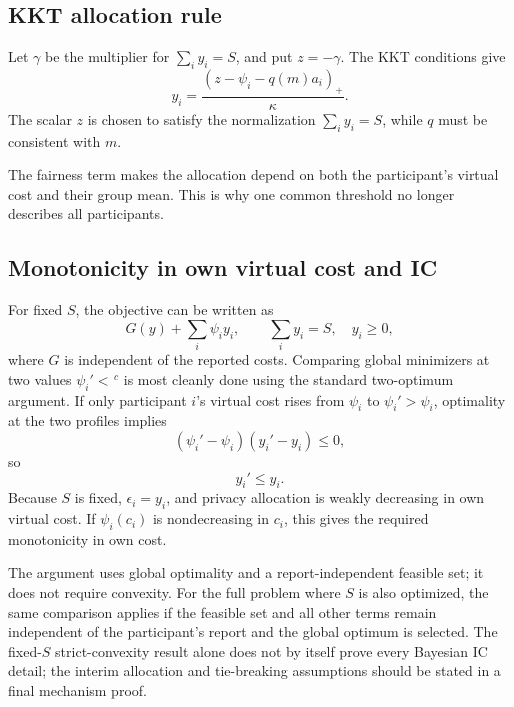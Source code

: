 \documentclass[11pt,a4paper]{article}
\newcommand{\1}{\mathbf{1}}
\begin{document}
\subsection{KKT allocation rule}

Let \(\gamma\) be the multiplier for \(\sum_i y_i=S\), and put
\(z=-\gamma\). The KKT conditions give
\begin{equation}
  \boxed{
  y_i
  =
  \frac{(z-\psi_i-q(m)a_i)_+}{\kappa}.
  }
  \label{eq:kkt-y}
\end{equation}
The scalar \(z\) is chosen to satisfy the normalization
\(\sum_i y_i=S\), while \(q\) must be consistent with \(m\).

The fairness term makes the allocation depend on both the participant's
virtual cost and their group mean. This is why one common threshold no
longer describes all participants.

\subsection{Monotonicity in own virtual cost and IC}

For fixed \(S\), the objective can be written as
\[
G(y)+\sum_i\psi_i y_i,
\qquad
\sum_i y_i=S,\quad y_i\geq0,
\]
where \(G\) is independent of the reported costs. Comparing global
minimizers at two values \(\psi_i'<\!\!{}^{\,c}\) is most cleanly done
using the standard two-optimum argument. If only participant \(i\)'s
virtual cost rises from \(\psi_i\) to \(\psi_i'>\psi_i\), optimality at
the two profiles implies
\begin{equation}
  (\psi_i'-\psi_i)(y_i'-y_i)\leq0,
\end{equation}
so
\begin{equation}
  y_i'\leq y_i.
\end{equation}
Because \(S\) is fixed, \(\epsilon_i=y_i\), and privacy allocation is
weakly decreasing in own virtual cost. If \(\psi_i(c_i)\) is
nondecreasing in \(c_i\), this gives the required monotonicity in own
cost.

The argument uses global optimality and a report-independent feasible
set; it does not require convexity. For the full problem where \(S\) is
also optimized, the same comparison applies if the feasible set and all
other terms remain independent of the participant's report and the
global optimum is selected. The fixed-\(S\) strict-convexity result alone
does not by itself prove every Bayesian IC detail; the interim allocation
and tie-breaking assumptions should be stated in a final mechanism proof.
\end{document}
